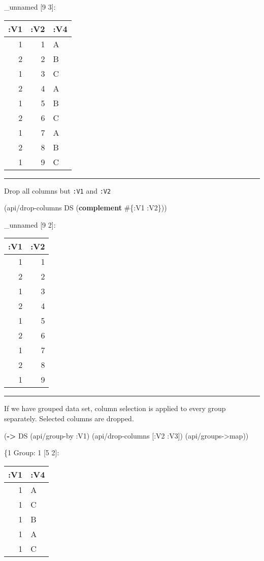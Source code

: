 \documentclass[]{article}
\newenvironment{Shaded}{\begin{snugshade}}{\end{snugshade}}
\newcommand{\KeywordTok}[1]{\textcolor[rgb]{0.13,0.29,0.53}{\textbf{#1}}}
\newcommand{\AttributeTok}[1]{\textcolor[rgb]{0.77,0.63,0.00}{#1}}
\newcommand{\NormalTok}[1]{#1}
\begin{document}
\_unnamed {[}9 3{]}:

\begin{longtable}[]{@{}rrl@{}}
\toprule
:V1 & :V2 & :V4\tabularnewline
\midrule
\endhead
1 & 1 & A\tabularnewline
2 & 2 & B\tabularnewline
1 & 3 & C\tabularnewline
2 & 4 & A\tabularnewline
1 & 5 & B\tabularnewline
2 & 6 & C\tabularnewline
1 & 7 & A\tabularnewline
2 & 8 & B\tabularnewline
1 & 9 & C\tabularnewline
\bottomrule
\end{longtable}

\begin{center}\rule{0.5\linewidth}{0.5pt}\end{center}

Drop all columns but \texttt{:V1} and \texttt{:V2}

\begin{Shaded}
\begin{Highlighting}[]
\NormalTok{(api/drop-columns DS (}\KeywordTok{complement}\NormalTok{ #\{}\AttributeTok{:V1} \AttributeTok{:V2}\NormalTok{\}))}
\end{Highlighting}
\end{Shaded}

\_unnamed {[}9 2{]}:

\begin{longtable}[]{@{}rr@{}}
\toprule
:V1 & :V2\tabularnewline
\midrule
\endhead
1 & 1\tabularnewline
2 & 2\tabularnewline
1 & 3\tabularnewline
2 & 4\tabularnewline
1 & 5\tabularnewline
2 & 6\tabularnewline
1 & 7\tabularnewline
2 & 8\tabularnewline
1 & 9\tabularnewline
\bottomrule
\end{longtable}

\begin{center}\rule{0.5\linewidth}{0.5pt}\end{center}

If we have grouped data set, column selection is applied to every group
separately. Selected columns are dropped.

\begin{Shaded}
\begin{Highlighting}[]
\NormalTok{(}\KeywordTok{->}\NormalTok{ DS}
\NormalTok{    (api/group-by }\AttributeTok{:V1}\NormalTok{)}
\NormalTok{    (api/drop-columns [}\AttributeTok{:V2} \AttributeTok{:V3}\NormalTok{])}
\NormalTok{    (api/groups->map))}
\end{Highlighting}
\end{Shaded}

\{1 Group: 1 {[}5 2{]}:

\begin{longtable}[]{@{}rl@{}}
\toprule
:V1 & :V4\tabularnewline
\midrule
\endhead
1 & A\tabularnewline
1 & C\tabularnewline
1 & B\tabularnewline
1 & A\tabularnewline
1 & C\tabularnewline
\bottomrule
\end{longtable}
\end{document}
